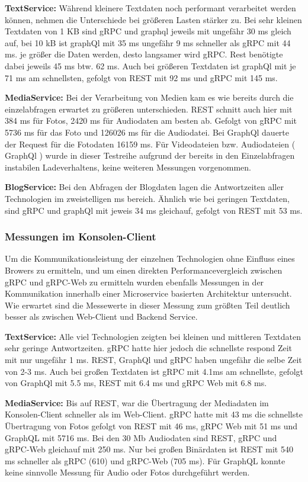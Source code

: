 \textbf{TextService:}  
Während kleinere Textdaten noch performant verarbeitet werden können, nehmen die Unterschiede bei größeren Lasten stärker zu. Bei sehr kleinen Textdaten von 1 KB sind gRPC und graphql jeweils mit ungefähr 30 ms gleich auf, bei 10 kB ist graphQl mit 35 ms ungefähr 9 ms schneller als gRPC mit 44 ms. je größer die Daten werden, desto langsamer wird gRPC. Rest benötigte dabei jeweils 45 ms btw. 62 ms. Auch bei größeren Textdaten ist graphQl mit je 71 ms am schnellsten, gefolgt von REST mit 92 ms und gRPC mit 145 ms. 

\textbf{MediaService:}  
Bei der Verarbeitung von Medien kam es wie bereits durch die einzelabfragen erwartet zu größeren unterschieden. REST schnitt auch hier mit 384 ms für Fotos, 2420 ms für Audiodaten am besten ab. Gefolgt von gRPC mit 5736 ms für das Foto und 126026 ms für die Audiodatei. Bei GraphQl dauerte der Request für die Fotodaten 16159 ms.
Für Videodateien bzw. Audiodateien ( GraphQl ) wurde in dieser Testreihe aufgrund der bereits in den Einzelabfragen instabilen Ladeverhaltens, keine weiteren Messungen vorgenommen.


\textbf{BlogService:}  
Bei den Abfragen der Blogdaten lagen die Antwortzeiten aller Technologien im zweistelligen ms bereich. Ähnlich wie bei geringen Textdaten, sind gRPC und graphQl mit jeweis 34 ms gleichauf, gefolgt von REST mit 53 ms.

\clearpage
\subsubsection{Messungen im Konsolen-Client}
Um die Kommunikationsleistung der einzelnen Technologien ohne Einfluss eines Browers zu ermitteln, und um einen direkten Performancevergleich zwischen gRPC und gRPC-Web zu ermitteln wurden ebenfalls Messungen in der Kommunikation innerhalb einer Microservice basierten Architektur untersucht. Wie erwartet sind die Messewerte in dieser Messung zum größten Teil deutlich besser als zwischen Web-Client und Backend Service.  

\textbf{TextService:}  
Alle viel Technologien zeigten bei kleinen und mittleren Textdaten sehr geringe Antwortzeiten. gRPC hatte hier jedoch die schnellste respond Zeit mit nur ungefähr 1 ms. REST, GraphQl und gRPC haben ungefähr die selbe Zeit von 2-3 ms.
Auch bei großen Textdaten ist gRPC mit 4.1ms am schnellste, gefolgt von GraphQl mit 5.5 ms, REST mit 6.4 ms und gRPC Web mit 6.8 ms.


\textbf{MediaService:}  
Bis auf REST, war die Übertragung der Mediadaten im Konsolen-Client schneller als im Web-Client. gRPC hatte mit 43 ms die schnellste Übertragung von Fotos gefolgt von REST mit 46 ms, gRPC Web mit 51 ms und GraphQL mit 5716 ms. Bei den 30 Mb Audiodaten sind REST, gRPC und gRPC-Web gleichauf mit 250 ms. Nur bei großen Binärdaten ist REST mit 540 ms schneller als gRPC (610) und gRPC-Web (705 ms). Für GraphQL konnte keine sinnvolle Messung für Audio oder Fotos durchgeführt werden.

